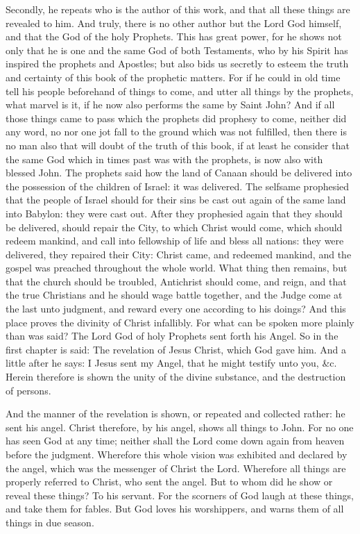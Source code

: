 Secondly, he repeats who is the author of this work, and that all these things are revealed to him. And truly, there is no other author but the Lord God himself, and that the God of the holy Prophets. This has great power, for he shows not only that he is one and the same God of both Testaments, who by his Spirit has inspired the prophets and Apostles; but also bids us secretly to esteem the truth and certainty of this book of the prophetic matters. For if he could in old time tell his people beforehand of things to come, and utter all things by the prophets, what marvel is it, if he now also performs the same by Saint John? And if all those things came to pass which the prophets did prophesy to come, neither did any word, no nor one jot fall to the ground which was not fulfilled, then there is no man also that will doubt of the truth of this book, if at least he consider that the same God which in times past was with the prophets, is now also with blessed John. The prophets said how the land of Canaan should be delivered into the possession of the children of Israel: it was delivered. The selfsame prophesied that the people of Israel should for their sins be cast out again of the same land into Babylon: they were cast out. After they prophesied again that they should be delivered, should repair the City, to which Christ would come, which should redeem mankind, and call into fellowship of life and bless all nations: they were delivered, they repaired their City: Christ came, and redeemed mankind, and the gospel was preached throughout the whole world. What thing then remains, but that the church should be troubled, Antichrist should come, and reign, and that the true Christians and he should wage battle together, and the Judge come at the last unto judgment, and reward every one according to his doings? And this place proves the divinity of Christ infallibly. For what can be spoken more plainly than was said? The Lord God of holy Prophets sent forth his Angel. So in the first chapter is said: The revelation of Jesus Christ, which God gave him. And a little after he says: I Jesus sent my Angel, that he might testify unto you, \&c. Herein therefore is shown the unity of the divine substance, and the destruction of persons.

And the manner of the revelation is shown, or repeated and collected rather: he sent his angel. Christ therefore, by his angel, shows all things to John. For no one has seen God at any time; neither shall the Lord come down again from heaven before the judgment. Wherefore this whole vision was exhibited and declared by the angel, which was the messenger of Christ the Lord. Wherefore all things are properly referred to Christ, who sent the angel. But to whom did he show or reveal these things? To his servant. For the scorners of God laugh at these things, and take them for fables. But God loves his worshippers, and warns them of all things in due season.

